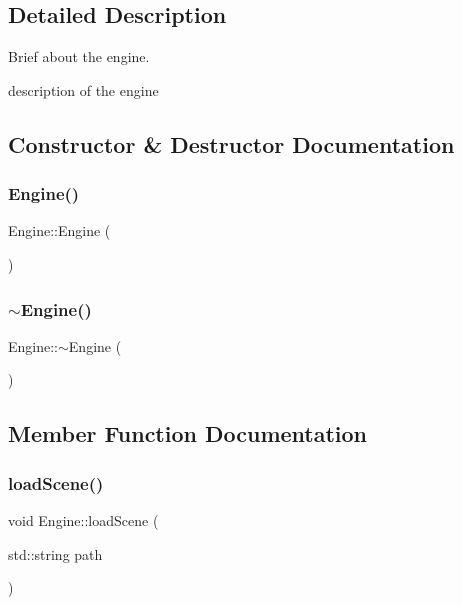 \subsection{Detailed Description}
Brief about the engine. 

description of the engine 

\subsection{Constructor \& Destructor Documentation}
\hypertarget{class_mason_1_1_engine_a8c98683b0a3aa28d8ab72a8bcd0d52f2}{}\label{class_mason_1_1_engine_a8c98683b0a3aa28d8ab72a8bcd0d52f2} 
\subsubsection{\texorpdfstring{Engine()}{Engine()}}
{\footnotesize\ttfamily Engine\+::\+Engine (\begin{DoxyParamCaption}{ }\end{DoxyParamCaption})}

\hypertarget{class_mason_1_1_engine_a8ef7030a089ecb30bbfcb9e43094717a}{}\label{class_mason_1_1_engine_a8ef7030a089ecb30bbfcb9e43094717a} 
\subsubsection{\texorpdfstring{$\sim$\+Engine()}{~Engine()}}
{\footnotesize\ttfamily Engine\+::$\sim$\+Engine (\begin{DoxyParamCaption}{ }\end{DoxyParamCaption})}



\subsection{Member Function Documentation}
\hypertarget{class_mason_1_1_engine_ab7f05ee3e9f917f11ed0deb20d4508b0}{}\label{class_mason_1_1_engine_ab7f05ee3e9f917f11ed0deb20d4508b0} 
\subsubsection{\texorpdfstring{load\+Scene()}{loadScene()}}
{\footnotesize\ttfamily void Engine\+::load\+Scene (\begin{DoxyParamCaption}\item[{std\+::string}]{path }\end{DoxyParamCaption})}


